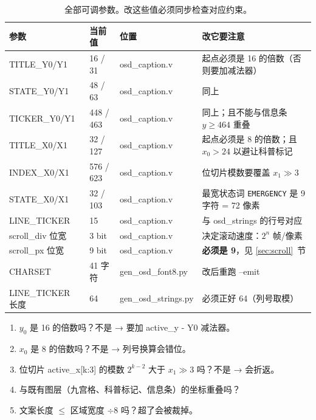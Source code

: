 \documentclass[10pt,a4paper]{article}
\newcommand{\sig}[1]{{\ttfamily\small #1}}
\newcommand{\code}[1]{{\ttfamily\small #1}}
\begin{document}
\begin{table}[htbp]
\centering\small
\caption{全部可调参数。改这些值必须同步检查对应约束。}
\label{tab:params}
\renewcommand{\arraystretch}{1.25}
\begin{tabularx}{\linewidth}{@{}l l l X@{}}
\toprule
\textbf{参数} & \textbf{当前值} & \textbf{位置} & \textbf{改它要注意}\\
\midrule
\code{TITLE\_Y0/Y1} & 16 / 31 & \sig{osd\_caption.v} & 起点必须是 16 的倍数（否则要加减法器）\\
\code{STATE\_Y0/Y1} & 48 / 63 & \sig{osd\_caption.v} & 同上\\
\code{TICKER\_Y0/Y1} & 448 / 463 & \sig{osd\_caption.v} & 同上；且不能与信息条 $y\ge464$ 重叠\\
\code{TITLE\_X0/X1} & 32 / 127 & \sig{osd\_caption.v} & 起点必须是 8 的倍数；且 $x_0>24$ 以避让科普标记\\
\code{INDEX\_X0/X1} & 576 / 623 & \sig{osd\_caption.v} & 位切片模数要覆盖 $x_1\gg3$\\
\code{STATE\_X0/X1} & 32 / 103 & \sig{osd\_caption.v} & 最宽状态词 \texttt{EMERGENCY} 是 9 字符 = 72 像素\\
\code{LINE\_TICKER} & 15 & \sig{osd\_caption.v} & 与 \sig{osd\_strings} 的行号对应\\
\code{scroll\_div} 位宽 & 3 bit & \sig{osd\_caption.v} & 决定滚动速度：$2^n$ 帧/像素\\
\code{scroll\_px} 位宽 & 9 bit & \sig{osd\_caption.v} & \textbf{必须是 9}，见 \ref{sec:scroll}~节\\
\code{CHARSET} & 41 字符 & \sig{gen\_osd\_font8.py} & 改后重跑 \code{--emit}\\
\code{LINE\_TICKER} 长度 & 64 & \sig{gen\_osd\_strings.py} & 必须正好 64（列号取模）\\
\bottomrule
\end{tabularx}
\end{table}

\begin{dswarn}[改坐标时的检查清单]
\begin{enumerate}
\item $y_0$ 是 16 的倍数吗？不是 → 要加 \code{active\_y - Y0} 减法器。
\item $x_0$ 是 8 的倍数吗？不是 → 列号换算会错位。
\item 位切片 \code{active\_x[k:3]} 的模数 $2^{k-2}$ 大于 $x_1\gg3$ 吗？不是 → 会折返。
\item 与既有图层（九宫格、科普标记、信息条）的坐标重叠吗？
\item 文案长度 $\le$ 区域宽度 $\div 8$ 吗？超了会被裁掉。
\end{enumerate}
\end{dswarn}
\end{document}
